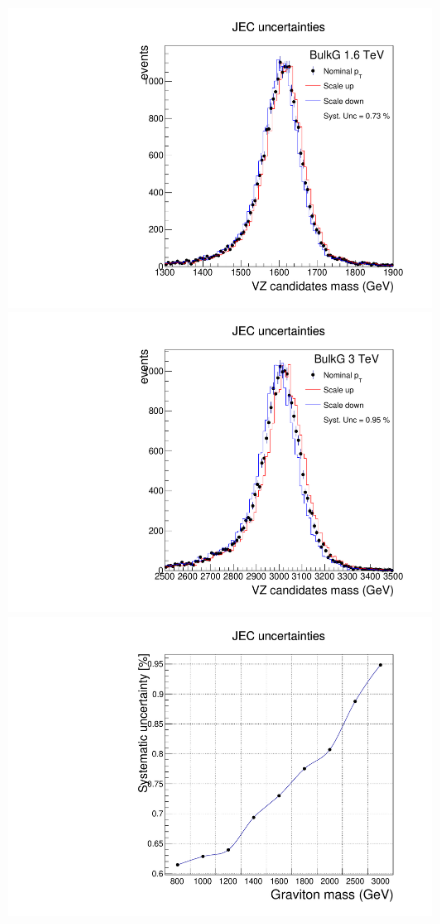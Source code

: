 \begin{figure}[hb!]
\begin{center}
\includegraphics[scale=0.30]{figures/systematics/jecUnc1600.pdf}
\includegraphics[scale=0.30]{figures/systematics/jecUnc3000.pdf}
\includegraphics[scale=0.30]{figures/systematics/jecUncMean.pdf}

\end{center}
\end{figure}
